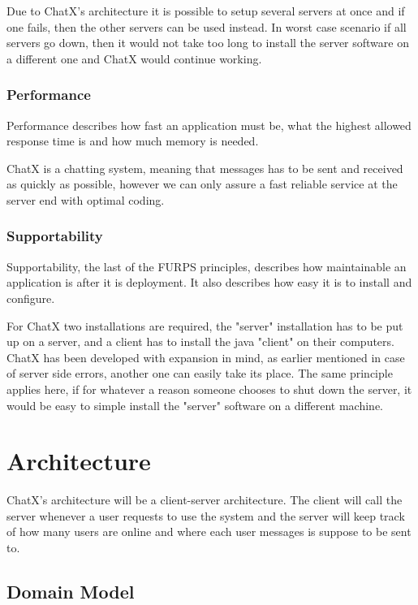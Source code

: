 Due to ChatX's architecture it is possible to setup several servers at once and if one fails, then the other servers can be used instead. In worst case scenario if all servers go down, then it would not take too long to install the server software on a different one and ChatX would continue working.

\subsubsection{Performance}Performance describes how fast an application must be, what the highest allowed response time is and how much memory is needed. 

ChatX is a chatting system, meaning that messages has to be sent and received as quickly as possible, however we can only assure a fast reliable service at the server end with optimal coding.

\subsubsection{Supportability}
Supportability, the last of the FURPS principles, describes how maintainable an application is after it is deployment. It also describes how easy it is to install and configure. 

For ChatX two installations are required, the "server" installation has to be put up on a server, and a client has to install the java "client" on their computers. ChatX has been developed with expansion in mind, as earlier mentioned in case of server side errors, another one can easily take its place. The same principle applies here, if for whatever a reason someone chooses to shut down the server, it would be easy to simple install the "server" software on a different machine.

\section{Architecture}
ChatX's architecture will be a client-server architecture. The client will call the server whenever a user requests to use the system and the server will keep track of how many users are online and where each user messages is suppose to be sent to.

\subsection{Domain Model}


